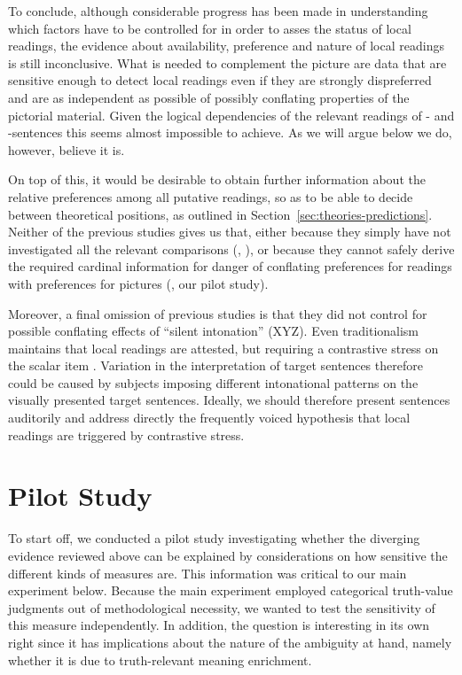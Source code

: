 \documentclass[fleqn,reqno,10pt,draft]{article}
\newcommand{\as}{\acro{as}}
\renewcommand{\es}{\acro{es}}
\begin{document}
To conclude, although considerable progress has been made in understanding which factors
have to be controlled for in order to asses the status of local readings, the evidence about availability,
preference and nature of local readings is still inconclusive. What is needed to complement
the picture are data that are sensitive enough to detect local readings even if they
are strongly dispreferred and are as independent as possible of possibly conflating properties
of the pictorial material. Given the logical dependencies of the
relevant readings of \as- and \es-sentences this seems almost
impossible to achieve. As we will argue below we do, however, believe it is.

On top of this, it would be desirable to obtain further information about
the relative preferences among all putative readings, so as to be able
to decide between theoretical positions, as outlined in
Section~\ref{sec:theories-predictions}. Neither of the previous
studies gives us that, either because they simply have not
investigated all the relevant comparisons
(\citet{GeurtsPouscoulous2009:Embedded-Implic},
\citet{CliftonDube2010:Embedded-Implic}), or because they cannot safely
derive the required cardinal information for danger of conflating
preferences for readings with preferences for pictures
(\citet{ChemlaSpector2010:Experimental-Ev}, our pilot study).

Moreover, a final omission of previous studies is that they did not
control for possible conflating effects of ``silent intonation''
(XYZ). Even traditionalism maintains that local
readings are attested, but requiring a contrastive stress on the
scalar item
\citep[e.g.][]{Horn2006:The-Border-Wars,Geurts2009:Scalar-Implicat,Geurts2010:Quantity-Implic,Tielvan-Tiel2012:Embedded-Scalar}. Variation
in the interpretation of target sentences therefore could be caused by
subjects imposing different intonational patterns on the visually
presented target sentences. Ideally, we should therefore present
sentences auditorily and address directly the frequently voiced
hypothesis that local readings are triggered by contrastive
stress.


\section{Pilot Study}
To start off, we conducted  a pilot study  investigating whether the diverging evidence reviewed above can be explained by considerations on how sensitive the different kinds of measures are. This information was critical to our main experiment below. Because the main experiment employed categorical truth-value judgments out of methodological necessity, we wanted to test the sensitivity of this measure independently. In addition, the question is interesting in its own right since it has implications about the nature of the ambiguity at hand, namely whether it is due to truth-relevant meaning enrichment. 
\end{document}
